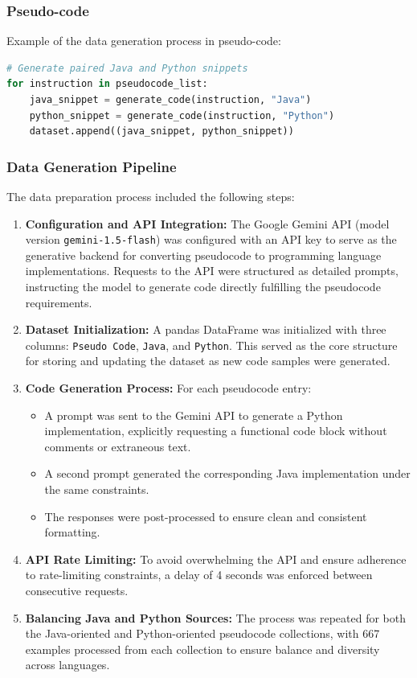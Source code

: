 \documentclass{dhbenelux}
\begin{document}
\subsubsection{Pseudo-code}

\noindent Example of the data generation process in pseudo-code:
\begin{lstlisting}[language=Python, caption={Pseudocode for Dataset Preparation}]
# Generate paired Java and Python snippets
for instruction in pseudocode_list:
    java_snippet = generate_code(instruction, "Java")
    python_snippet = generate_code(instruction, "Python")
    dataset.append((java_snippet, python_snippet))
\end{lstlisting}

\subsubsection{Data Generation Pipeline}
The data preparation process included the following steps:
\begin{enumerate}
  \item \textbf{Configuration and API Integration:} The Google Gemini API (model version \texttt{gemini-1.5-flash}) was configured with an API key to serve as the generative backend for converting pseudocode to programming language implementations. Requests to the API were structured as detailed prompts, instructing the model to generate code directly fulfilling the pseudocode requirements.
  \item \textbf{Dataset Initialization:} A pandas DataFrame was initialized with three columns: \texttt{Pseudo Code}, \texttt{Java}, and \texttt{Python}. This served as the core structure for storing and updating the dataset as new code samples were generated.
  \item \textbf{Code Generation Process:} For each pseudocode entry:
    \begin{itemize}
        \item A prompt was sent to the Gemini API to generate a Python implementation, explicitly requesting a functional code block without comments or extraneous text.
        \item A second prompt generated the corresponding Java implementation under the same constraints.
        \item The responses were post-processed to ensure clean and consistent formatting.
    \end{itemize}
  \item \textbf{API Rate Limiting:} To avoid overwhelming the API and ensure adherence to rate-limiting constraints, a delay of 4 seconds was enforced between consecutive requests.
  \item \textbf{Balancing Java and Python Sources:} The process was repeated for both the Java-oriented and Python-oriented pseudocode collections, with 667 examples processed from each collection to ensure balance and diversity across languages.
\end{enumerate}
\end{document}

